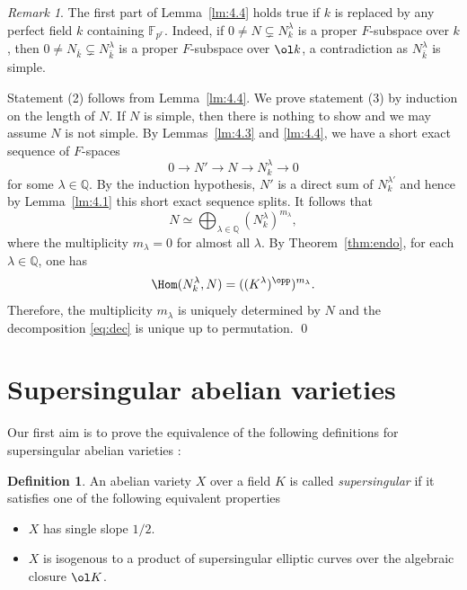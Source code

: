 \documentclass[]{amsart}
\theoremstyle{plain}
\theoremstyle{definition}
\newtheorem{defn}[thm]{Definition}
\theoremstyle{remark}
\newtheorem{remark}[thm]{Remark}
\newcommand{\Q}{\mathbb Q}
\newcommand{\F}{\mathbb F}
\newcommand{\npr}{\noindent }
\newcommand{\<}{\langle}   %
\renewcommand{\>}{\rangle} %
\begin{document}
\begin{remark}
    The first part of Lemma~\ref{lm:4.4} holds true if $k$ is replaced by any perfect field $k$ containing $\F_{p^r}$. Indeed, if $0\neq N\subsetneq N^\lambda_k$ is a proper $F$-subspace over $k$, then 
    $0\neq N_{\bar k} \subsetneq N^\lambda_{\bar k}$ is a proper $F$-subspace over $\ol k$, a contradiction as $N^\lambda_{\bar k}$ is simple.
\end{remark}


\npr {\bf Proof of Theorem~\ref{thm:manin}.}
Statement (2) follows from Lemma~\ref{lm:4.4}. We prove statement (3) by induction on the length of $N$. If $N$ is simple, then there is nothing to show and we may assume $N$ is not simple. 
By Lemmas~\ref{lm:4.3} and \ref{lm:4.4}, we have a short exact sequence of $F$-spaces
\[ 0 \longrightarrow N'\longrightarrow N \longrightarrow N_k^\lambda \longrightarrow 0\]
for some $\lambda\in \Q$. By the induction hypothesis, $N'$ is a direct sum of $N_k^{\lambda'}$ and hence by Lemma~\ref{lm:4.1} this short exact sequence splits. 
It follows that 
\begin{equation}
    \label{eq:dec} 
     N\simeq \bigoplus_{\lambda\in \Q} (N^\lambda_k)^{m_\lambda},
\end{equation}
where the multiplicity $m_\lambda=0$ for almost all $\lambda$. By Theorem~\ref{thm:endo}, for each $\lambda\in \Q$, one has \[ \Hom(N^\lambda_k, N)=((K^\lambda)^\opp)^{m_\lambda}. \]  
Therefore, the multiplicity $m_\lambda$ is uniquely determined by $N$ and the decomposition \eqref{eq:dec} is unique up to permutation. \qed



\section{Supersingular abelian varieties}

Our first aim is to prove the equivalence of the following
definitions for supersingular abelian varieties \cite[Theorem 4.2]{oort:subvar}:

\begin{defn}
  An abelian variety $X$ over a field $K$ is called
  \emph{supersingular} if it satisfies one of the following equivalent
  properties
  \begin{itemize}
  \item [(a)] $X$ has single slope $1/2$.
  \item [(b)] $X$ is isogenous to a product of supersingular elliptic
    curves over the  algebraic closure $\ol K$.     
  \end{itemize}
\end{defn}
\end{document}
